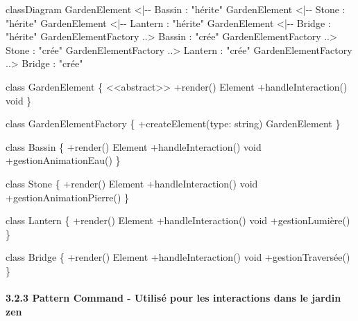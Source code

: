\documentclass[
]{article}
\newenvironment{Shaded}{}{}
\newcommand{\NormalTok}[1]{#1}
\begin{document}
\begin{Shaded}
\begin{Highlighting}[]
\NormalTok{classDiagram}
\NormalTok{    GardenElement \textless{}|{-}{-} Bassin : "hérite"}
\NormalTok{    GardenElement \textless{}|{-}{-} Stone : "hérite"}
\NormalTok{    GardenElement \textless{}|{-}{-} Lantern : "hérite"}
\NormalTok{    GardenElement \textless{}|{-}{-} Bridge : "hérite"}
\NormalTok{    GardenElementFactory ..\textgreater{} Bassin : "crée"}
\NormalTok{    GardenElementFactory ..\textgreater{} Stone : "crée"}
\NormalTok{    GardenElementFactory ..\textgreater{} Lantern : "crée"}
\NormalTok{    GardenElementFactory ..\textgreater{} Bridge : "crée"}
    
\NormalTok{    class GardenElement \{}
\NormalTok{        \textless{}\textless{}abstract\textgreater{}\textgreater{}}
\NormalTok{        +render() Element}
\NormalTok{        +handleInteraction() void}
\NormalTok{    \}}
    
\NormalTok{    class GardenElementFactory \{}
\NormalTok{        +createElement(type: string) GardenElement}
\NormalTok{    \}}
    
\NormalTok{    class Bassin \{}
\NormalTok{        +render() Element}
\NormalTok{        +handleInteraction() void}
\NormalTok{        +gestionAnimationEau()}
\NormalTok{    \}}
    
\NormalTok{    class Stone \{}
\NormalTok{        +render() Element}
\NormalTok{        +handleInteraction() void}
\NormalTok{        +gestionAnimationPierre()}
\NormalTok{    \}}
    
\NormalTok{    class Lantern \{}
\NormalTok{        +render() Element}
\NormalTok{        +handleInteraction() void}
\NormalTok{        +gestionLumière()}
\NormalTok{    \}}
    
\NormalTok{    class Bridge \{}
\NormalTok{        +render() Element}
\NormalTok{        +handleInteraction() void}
\NormalTok{        +gestionTraversée()}
\NormalTok{    \}}
\end{Highlighting}
\end{Shaded}

\paragraph{3.2.3 Pattern Command - Utilisé pour les interactions dans le
jardin
zen}\label{pattern-command---utilisuxe9-pour-les-interactions-dans-le-jardin-zen}
\end{document}
